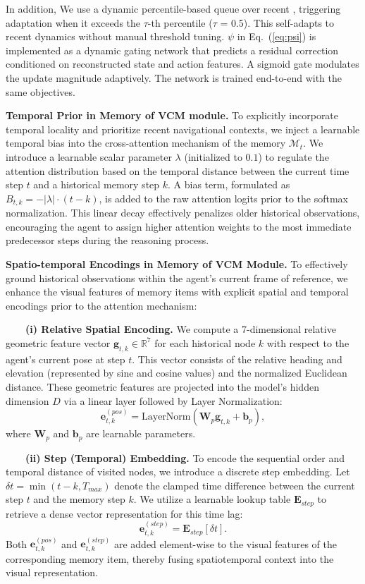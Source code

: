 \documentclass{article}
\theoremstyle{plain}
\theoremstyle{definition}
\theoremstyle{remark}
\begin{document}
In addition, We use a dynamic percentile-based queue over recent , triggering adaptation when it exceeds the $\tau$-th percentile ($\tau$ = 0.5). This self-adapts to recent dynamics without manual threshold tuning. $\psi$ in Eq.~(\ref{eq:psi}) is implemented as a dynamic gating network that predicts a residual correction conditioned on reconstructed state and action features. A sigmoid gate modulates the update magnitude adaptively. The network is trained end-to-end with the same objectives.

\textbf{Temporal Prior in Memory of VCM module.} To explicitly incorporate temporal locality and prioritize recent navigational contexts, we inject a learnable temporal bias into the cross-attention mechanism of the memory $\mathcal{M}_t$. We introduce a learnable scalar parameter $\lambda$ (initialized to $0.1$) to regulate the attention distribution based on the temporal distance between the current time step $t$ and a historical memory step $k$. A bias term, formulated as $B_{t,k} = -|\lambda| \cdot (t - k)$, is added to the raw attention logits prior to the softmax normalization. This linear decay effectively penalizes older historical observations, encouraging the agent to assign higher attention weights to the most immediate predecessor steps during the reasoning process.

\textbf{Spatio-temporal Encodings in Memory of VCM Module.} To effectively ground historical observations within the agent's current frame of reference, we enhance the visual features of memory items with explicit spatial and temporal encodings prior to the attention mechanism:

~~~~\textbf{(i) Relative Spatial Encoding.} 
We compute a 7-dimensional relative geometric feature vector $\mathbf{g}_{t,k} \in \mathbb{R}^7$ for each historical node $k$ with respect to the agent's current pose at step $t$. This vector consists of the relative heading and elevation (represented by sine and cosine values) and the normalized Euclidean distance. These geometric features are projected into the model's hidden dimension $D$ via a linear layer followed by Layer Normalization:
\begin{equation}
    \mathbf{e}^{(pos)}_{t,k} = \text{LayerNorm}(\mathbf{W}_p \mathbf{g}_{t,k} + \mathbf{b}_p),
\end{equation}
where $\mathbf{W}_p$ and $\mathbf{b}_p$ are learnable parameters.

~~~~\textbf{(ii) Step (Temporal) Embedding.} 
To encode the sequential order and temporal distance of visited nodes, we introduce a discrete step embedding. Let $\delta t = \min(t - k, T_{max})$ denote the clamped time difference between the current step $t$ and the memory step $k$. We utilize a learnable lookup table $\mathbf{E}_{step}$ to retrieve a dense vector representation for this time lag:
\begin{equation}
    \mathbf{e}^{(step)}_{t,k} = \mathbf{E}_{step}[\delta t].
\end{equation}
Both $\mathbf{e}^{(pos)}_{t,k}$ and $\mathbf{e}^{(step)}_{t,k}$ are added element-wise to the visual features of the corresponding memory item, thereby fusing spatiotemporal context into the visual representation.
\end{document}
